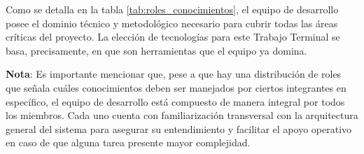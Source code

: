 Como se detalla en la tabla \ref{tab:roles_conocimientos}, el equipo de desarrollo posee el dominio técnico y metodológico necesario para cubrir todas las áreas críticas del proyecto. La elección de tecnologías para este Trabajo Terminal se basa, precisamente, en que son herramientas que el equipo ya domina.

\textbf{Nota}: Es importante mencionar que, pese a que hay una distribución de roles que señala cuáles conocimientos deben ser manejados por ciertos integrantes en específico, el equipo de desarrollo está compuesto de manera integral por todos los miembros. Cada uno cuenta con familiarización transversal con la arquitectura general del sistema para asegurar su entendimiento y facilitar el apoyo operativo en caso de que alguna tarea presente mayor complejidad.